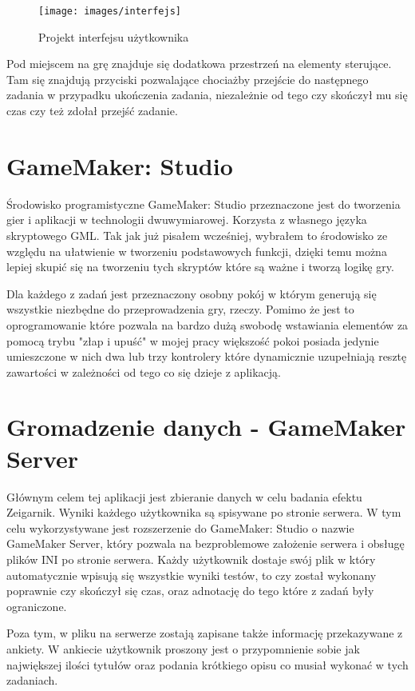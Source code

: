 \documentclass[openright]{xmgr}
\begin{document}
\begin{figure}[H]
\centering
\texttt{[image: images/interfejs]}
\caption{Projekt interfejsu użytkownika}
\label{fig:obrazek k}
\end{figure}

Pod miejscem na grę znajduje się dodatkowa przestrzeń na elementy sterujące. Tam się znajdują przyciski pozwalające chociażby przejście do następnego zadania w przypadku ukończenia zadania, niezależnie od tego czy skończył mu się czas czy też zdołał przejść zadanie.

\section{GameMaker: Studio}
Środowisko programistyczne GameMaker: Studio przeznaczone jest do tworzenia gier i aplikacji w technologii dwuwymiarowej. Korzysta z własnego języka skryptowego GML. Tak jak już pisałem wcześniej, wybrałem to środowisko ze względu na ułatwienie w tworzeniu podstawowych funkcji, dzięki temu można lepiej skupić się na tworzeniu tych skryptów które są ważne i tworzą logikę gry.

Dla każdego z zadań jest przeznaczony osobny pokój w którym generują się wszystkie niezbędne do przeprowadzenia gry, rzeczy. Pomimo że jest to oprogramowanie które pozwala na bardzo dużą swobodę wstawiania elementów za pomocą trybu "złap i upuść" w mojej pracy większość pokoi posiada jedynie umieszczone w nich dwa lub trzy kontrolery które dynamicznie uzupełniają resztę zawartości w zależności od tego co się dzieje z aplikacją. 

\section{Gromadzenie danych - GameMaker Server}
Głównym celem tej aplikacji jest zbieranie danych w celu badania efektu Zeigarnik. Wyniki każdego użytkownika są spisywane po stronie serwera. W tym celu wykorzystywane jest rozszerzenie do GameMaker: Studio o nazwie GameMaker Server, który pozwala na bezproblemowe założenie serwera i obsługę plików INI po stronie serwera. Każdy użytkownik dostaje swój plik w który automatycznie wpisują się wszystkie wyniki testów, to czy został wykonany poprawnie czy skończył się czas, oraz adnotację do tego które z zadań były ograniczone.

Poza tym, w pliku na serwerze zostają zapisane także informację przekazywane z ankiety. W ankiecie użytkownik proszony jest o przypomnienie sobie jak największej ilości tytułów oraz podania krótkiego opisu co musiał wykonać w tych zadaniach. 
\end{document}
